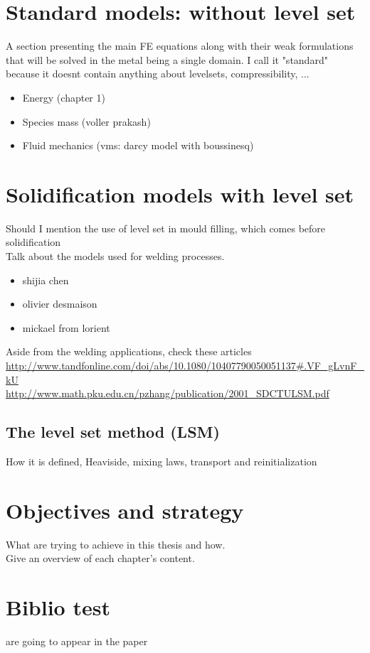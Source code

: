 \section{Standard models: without level set}
A section presenting the main FE equations along with their weak formulations that will be solved 
in the metal being a single domain. I call it "standard" because it doesnt contain anything about 
levelsets, compressibility, ...
\begin{itemize}
\item Energy (chapter 1)
\item Species mass (voller prakash) 
\item Fluid mechanics (vms: darcy model with boussinesq)
\end{itemize}

\section{Solidification models with level set}
Should I mention the use of level set in mould filling, which comes before solidification \\
Talk about the models used for welding processes. 
\begin{itemize}
\item shijia chen
\item olivier desmaison
\item mickael from lorient 
\end{itemize}
Aside from the welding applications, check these articles
\url{http://www.tandfonline.com/doi/abs/10.1080/10407790050051137#.VF_gLvnF_kU} \\
\url{http://www.math.pku.edu.cn/pzhang/publication/2001_SDCTULSM.pdf}


\subsection{The level set method (LSM)}
How it is defined, Heaviside, mixing laws, transport and reinitialization

\section{Objectives and strategy}
What are trying to achieve in this thesis and how. \\
Give an overview of each chapter's content.

\section{Biblio test}
\cite{carozzani_direct_2013} are going to appear in the paper 